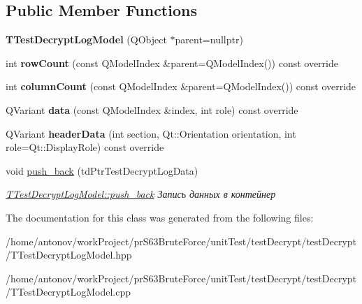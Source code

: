 \subsection*{Public Member Functions}
\begin{DoxyCompactItemize}
\item 
\mbox{\label{classunit_test_1_1_t_test_decrypt_log_model_a6a8adb01c36da28db9090a0ac6b4e31e}} 
{\bfseries T\+Test\+Decrypt\+Log\+Model} (Q\+Object $\ast$parent=nullptr)
\item 
\mbox{\label{classunit_test_1_1_t_test_decrypt_log_model_aa1e63c66c5ae0cf23d1d3bfd38f77ca9}} 
int {\bfseries row\+Count} (const Q\+Model\+Index \&parent=Q\+Model\+Index()) const override
\item 
\mbox{\label{classunit_test_1_1_t_test_decrypt_log_model_a327903c85483995577c21a657e5a588d}} 
int {\bfseries column\+Count} (const Q\+Model\+Index \&parent=Q\+Model\+Index()) const override
\item 
\mbox{\label{classunit_test_1_1_t_test_decrypt_log_model_a56ce71a24472272a0589138355793983}} 
Q\+Variant {\bfseries data} (const Q\+Model\+Index \&index, int role) const override
\item 
\mbox{\label{classunit_test_1_1_t_test_decrypt_log_model_a90f6d04c235a49954430e4821c2be7b4}} 
Q\+Variant {\bfseries header\+Data} (int section, Qt\+::\+Orientation orientation, int role=Qt\+::\+Display\+Role) const override
\item 
\mbox{\label{classunit_test_1_1_t_test_decrypt_log_model_ad7c0c8972ddf780f3e0ff2579390184f}} 
void \hyperlink{classunit_test_1_1_t_test_decrypt_log_model_ad7c0c8972ddf780f3e0ff2579390184f}{push\+\_\+back} (td\+Ptr\+Test\+Decrypt\+Log\+Data)
\begin{DoxyCompactList}\small\item\em \hyperlink{classunit_test_1_1_t_test_decrypt_log_model_ad7c0c8972ddf780f3e0ff2579390184f}{T\+Test\+Decrypt\+Log\+Model\+::push\+\_\+back} Запись данных в контейнер \end{DoxyCompactList}\end{DoxyCompactItemize}


The documentation for this class was generated from the following files\+:\begin{DoxyCompactItemize}
\item 
/home/antonov/work\+Project/pr\+S63\+Brute\+Force/unit\+Test/test\+Decrypt/test\+Decrypt/T\+Test\+Decrypt\+Log\+Model.\+hpp\item 
/home/antonov/work\+Project/pr\+S63\+Brute\+Force/unit\+Test/test\+Decrypt/test\+Decrypt/T\+Test\+Decrypt\+Log\+Model.\+cpp\end{DoxyCompactItemize}
